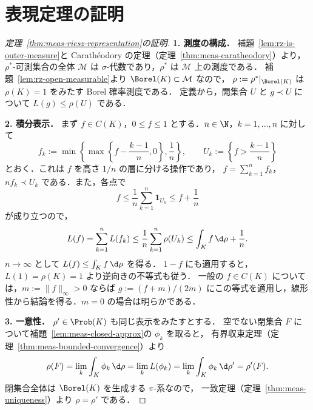 \section{表現定理の証明}

\begin{proof}[定理~\ref{thm:meas-riesz-representation}の証明]
  \textbf{1. 測度の構成．}
  補題~\ref{lem:rz-is-outer-measure}と Carathéodory の定理（定理~\ref{thm:meas-caratheodory}）より，
  $\rho^*$-可測集合の全体 $\mathcal{M}$ は $\sigma$-代数であり，$\rho^*$ は $\mathcal{M}$ 上の測度である．
  補題~\ref{lem:rz-open-measurable}より $\Borel(K)\subset\mathcal{M}$ なので，
  $\rho:=\rho^*|_{\Borel(K)}$ は $\rho(K)=1$ をみたす Borel 確率測度である．
  定義から，開集合 $U$ と $g\prec U$ について $L(g)\leq\rho(U)$ である．

  \textbf{2. 積分表示．}
  まず $f\in C(K)$，$0\leq f\leq1$ とする．$n\in\N$，$k=1,\dots,n$ に対して
  \[
    f_k:=\min\left\{\max\left\{f-\frac{k-1}n,0\right\},\frac1n\right\},\qquad
    U_k:=\left\{f>\frac{k-1}n\right\}
  \]
  とおく．これは $f$ を高さ $1/n$ の層に分ける操作であり，
  $f=\sum_{k=1}^nf_k$，$nf_k\prec U_k$ である．また，各点で
  \[
    f\leq\frac1n\sum_{k=1}^n\mathbf{1}_{U_k}\leq f+\frac1n
  \]
  が成り立つので，
  \[
    L(f)=\sum_{k=1}^nL(f_k)
    \leq\frac1n\sum_{k=1}^n\rho(U_k)
    \leq\int_Kf\,\d\rho+\frac1n.
  \]
  $n\to\infty$ として $L(f)\leq\int_Kf\,\d\rho$ を得る．
  $1-f$ にも適用すると，$L(1)=\rho(K)=1$ より逆向きの不等式も従う．
  一般の $f\in C(K)$ については，$m:=\lVert f\rVert_\infty>0$ ならば
  $g:=(f+m)/(2m)$ にこの等式を適用し，線形性から結論を得る．$m=0$ の場合は明らかである．

  \textbf{3. 一意性．}
  $\rho'\in\Prob(K)$ も同じ表示をみたすとする．
  空でない閉集合 $F$ について補題~\ref{lem:meas-closed-approx}の $\phi_k$ を取ると，
  有界収束定理（定理~\ref{thm:meas-bounded-convergence}）より
  \[
    \rho(F)=\lim_k\int_K\phi_k\,\d\rho=\lim_kL(\phi_k)
    =\lim_k\int_K\phi_k\,\d\rho'=\rho'(F).
  \]
  閉集合全体は $\Borel(K)$ を生成する $\pi$-系なので，
  一致定理（定理~\ref{thm:meas-uniqueness}）より $\rho=\rho'$ である．
\end{proof}
